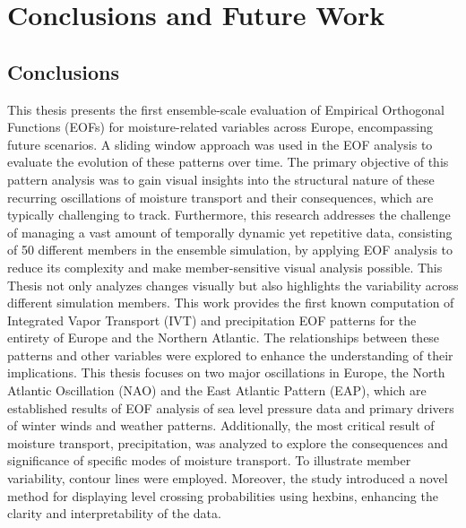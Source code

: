 \chapter{Conclusions and Future Work}
\label{ch:conclusions}

\section{Conclusions}
\label{sec:conclusions}


This thesis presents the first ensemble-scale evaluation of Empirical Orthogonal Functions (EOFs) for moisture-related variables across Europe, encompassing future scenarios. A sliding window approach was used in the EOF analysis to evaluate the evolution of these patterns over time. The primary objective of this pattern analysis was to gain visual insights into the structural nature of these recurring oscillations of moisture transport and their consequences, which are typically challenging to track.
Furthermore, this research addresses the challenge of managing a vast amount of temporally dynamic yet repetitive data, consisting of 50 different members in the ensemble simulation, by applying EOF analysis to reduce its complexity and make member-sensitive visual analysis possible. This Thesis not only analyzes changes visually but also highlights the variability across different simulation members.
This work provides the first known computation of Integrated Vapor Transport (IVT) and precipitation EOF patterns for the entirety of Europe and the Northern Atlantic. The relationships between these patterns and other variables were explored to enhance the understanding of their implications. This thesis focuses on two major oscillations in Europe, the North Atlantic Oscillation (NAO) and the East Atlantic Pattern (EAP), which are established results of EOF analysis of sea level pressure data and primary drivers of winter winds and weather patterns.
Additionally, the most critical result of moisture transport, precipitation, was analyzed to explore the consequences and significance of specific modes of moisture transport. To illustrate member variability, contour lines were employed. Moreover, the study introduced a novel method for displaying level crossing probabilities using hexbins, enhancing the clarity and interpretability of the data. 
%

